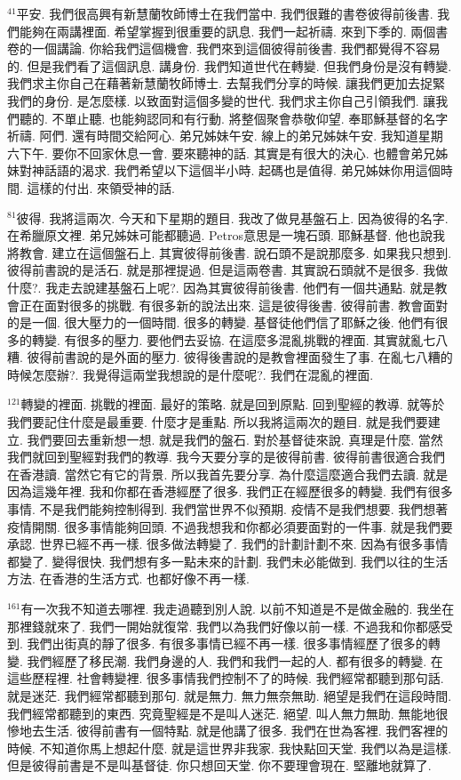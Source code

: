 \documentclass{book}
\begin{document}
$^{41}$平安.
我們很高興有新慧蘭牧師博士在我們當中.
我們很難的書卷彼得前後書.
我們能夠在兩講裡面.
希望掌握到很重要的訊息.
我們一起祈禱.
來到下季的.
兩個書卷的一個講論.
你給我們這個機會.
我們來到這個彼得前後書.
我們都覺得不容易的.
但是我們看了這個訊息.
講身份.
我們知道世代在轉變.
但我們身份是沒有轉變.
我們求主你自己在藉著新慧蘭牧師博士.
去幫我們分享的時候.
讓我們更加去捉緊我們的身份.
是怎麼樣.
以致面對這個多變的世代.
我們求主你自己引領我們.
讓我們聽的.
不單止聽.
也能夠認同和有行動.
將整個聚會恭敬仰望.
奉耶穌基督的名字祈禱.
阿們.
還有時間交給阿心.
弟兄姊妹午安.
線上的弟兄姊妹午安.
我知道星期六下午.
要你不回家休息一會.
要來聽神的話.
其實是有很大的決心.
也體會弟兄姊妹對神話語的渴求.
我們希望以下這個半小時.
起碼也是值得.
弟兄姊妹你用這個時間.
這樣的付出.
來領受神的話.

$^{81}$彼得.
我將這兩次.
今天和下星期的題目.
我改了做見基盤石上.
因為彼得的名字.
在希臘原文裡.
弟兄姊妹可能都聽過.
Petros意思是一塊石頭.
耶穌基督.
他也說我將教會.
建立在這個盤石上.
其實彼得前後書.
說石頭不是說那麼多.
如果我只想到.
彼得前書說的是活石.
就是那裡提過.
但是這兩卷書.
其實說石頭就不是很多.
我做什麼?.
我走去說建基盤石上呢?.
因為其實彼得前後書.
他們有一個共通點.
就是教會正在面對很多的挑戰.
有很多新的說法出來.
這是彼得後書.
彼得前書.
教會面對的是一個.
很大壓力的一個時間.
很多的轉變.
基督徒他們信了耶穌之後.
他們有很多的轉變.
有很多的壓力.
要他們去妥協.
在這麼多混亂挑戰的裡面.
其實就亂七八糟.
彼得前書說的是外面的壓力.
彼得後書說的是教會裡面發生了事.
在亂七八糟的時候怎麼辦?.
我覺得這兩堂我想說的是什麼呢?.
我們在混亂的裡面.

$^{121}$轉變的裡面.
挑戰的裡面.
最好的策略.
就是回到原點.
回到聖經的教導.
就等於我們要記住什麼是最重要.
什麼才是重點.
所以我將這兩次的題目.
就是我們要建立.
我們要回去重新想一想.
就是我們的盤石.
對於基督徒來說.
真理是什麼.
當然我們就回到聖經對我們的教導.
我今天要分享的是彼得前書.
彼得前書很適合我們在香港讀.
當然它有它的背景.
所以我首先要分享.
為什麼這麼適合我們去讀.
就是因為這幾年裡.
我和你都在香港經歷了很多.
我們正在經歷很多的轉變.
我們有很多事情.
不是我們能夠控制得到.
我們當世界不似預期.
疫情不是我們想要.
我們想著疫情開關.
很多事情能夠回頭.
不過我想我和你都必須要面對的一件事.
就是我們要承認.
世界已經不再一樣.
很多做法轉變了.
我們的計劃計劃不來.
因為有很多事情都變了.
變得很快.
我們想有多一點未來的計劃.
我們未必能做到.
我們以往的生活方法.
在香港的生活方式.
也都好像不再一樣.

$^{161}$有一次我不知道去哪裡.
我走過聽到別人說.
以前不知道是不是做金融的.
我坐在那裡錢就來了.
我們一開始就復常.
我們以為我們好像以前一樣.
不過我和你都感受到.
我們出街真的靜了很多.
有很多事情已經不再一樣.
很多事情經歷了很多的轉變.
我們經歷了移民潮.
我們身邊的人.
我們和我們一起的人.
都有很多的轉變.
在這些歷程裡.
社會轉變裡.
很多事情我們控制不了的時候.
我們經常都聽到那句話.
就是迷茫.
我們經常都聽到那句.
就是無力.
無力無奈無助.
絕望是我們在這段時間.
我們經常都聽到的東西.
究竟聖經是不是叫人迷茫.
絕望.
叫人無力無助.
無能地很慘地去生活.
彼得前書有一個特點.
就是他講了很多.
我們在世為客裡.
我們客裡的時候.
不知道你馬上想起什麼.
就是這世界非我家.
我快點回天堂.
我們以為是這樣.
但是彼得前書是不是叫基督徒.
你只想回天堂.
你不要理會現在.
堅離地就算了.
\end{document}
